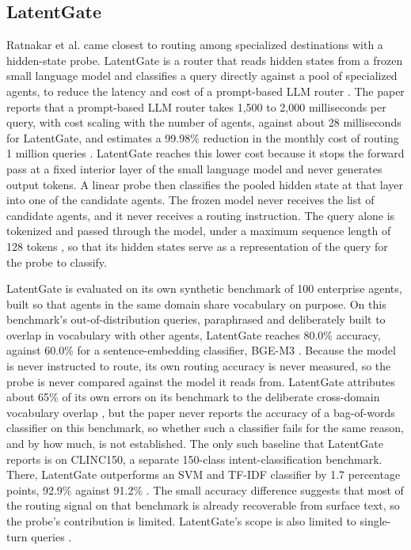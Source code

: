 \subsection{LatentGate}
\label{subsec:latentgate}

Ratnakar et al. came closest to routing among specialized destinations with a hidden-state probe. LatentGate is a router that reads hidden states from a frozen small language model and classifies a query directly against a pool of specialized agents, to reduce the latency and cost of a prompt-based LLM router \cite{ratnakarLatentGateLowLatencySemantic2026}. The paper reports that a prompt-based LLM router takes 1,500 to 2,000 milliseconds per query, with cost scaling with the number of agents, against about 28 milliseconds for LatentGate, and estimates a 99.98\% reduction in the monthly cost of routing 1 million queries \cite{ratnakarLatentGateLowLatencySemantic2026}. LatentGate reaches this lower cost because it stops the forward pass at a fixed interior layer of the small language model and never generates output tokens. A linear probe then classifies the pooled hidden state at that layer into one of the candidate agents. The frozen model never receives the list of candidate agents, and it never receives a routing instruction. The query alone is tokenized and passed through the model, under a maximum sequence length of 128 tokens \cite{ratnakarLatentGateLowLatencySemantic2026}, so that its hidden states serve as a representation of the query for the probe to classify.

LatentGate is evaluated on its own synthetic benchmark of 100 enterprise agents, built so that agents in the same domain share vocabulary on purpose. On this benchmark's out-of-distribution queries, paraphrased and deliberately built to overlap in vocabulary with other agents, LatentGate reaches 80.0\% accuracy, against 60.0\% for a sentence-embedding classifier, BGE-M3 \cite{ratnakarLatentGateLowLatencySemantic2026}. Because the model is never instructed to route, its own routing accuracy is never measured, so the probe is never compared against the model it reads from. LatentGate attributes about 65\% of its own errors on its benchmark to the deliberate cross-domain vocabulary overlap \cite{ratnakarLatentGateLowLatencySemantic2026}, but the paper never reports the accuracy of a bag-of-words classifier on this benchmark, so whether such a classifier fails for the same reason, and by how much, is not established. The only such baseline that LatentGate reports is on CLINC150, a separate 150-class intent-classification benchmark. There, LatentGate outperforms an SVM and TF-IDF classifier by 1.7 percentage points, 92.9\% against 91.2\% \cite{ratnakarLatentGateLowLatencySemantic2026}. The small accuracy difference suggests that most of the routing signal on that benchmark is already recoverable from surface text, so the probe's contribution is limited. LatentGate's scope is also limited to single-turn queries \cite{ratnakarLatentGateLowLatencySemantic2026}.

